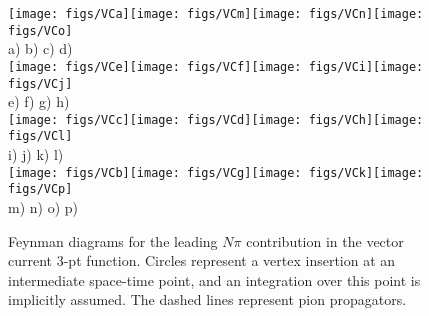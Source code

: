 \documentclass[11pt,prd,aps,showpacs,eqsecnum,floatfix,nofootinbib,preprint,tightenlines]{revtex4}
\begin{document}
%
\begin{figure}[t]
\texttt{[image: figs/VCa]}\hspace{0.3cm}\texttt{[image: figs/VCm]}\hspace{0.3cm}\texttt{[image: figs/VCn]}\hspace{0.3cm}\texttt{[image: figs/VCo]}\\
a)\hspace{3.5cm} b)\hspace{3.5cm} c)\hspace{3.5cm} d)\\[3ex]
\texttt{[image: figs/VCe]}\hspace{0.3cm}\texttt{[image: figs/VCf]}\hspace{0.3cm}\texttt{[image: figs/VCi]}\hspace{0.3cm}\texttt{[image: figs/VCj]}\\
e)\hspace{3.5cm} f)\hspace{3.5cm} g)\hspace{3.5cm} h) \\[3ex]
\texttt{[image: figs/VCc]}\hspace{0.3cm}\texttt{[image: figs/VCd]}\hspace{0.3cm}\texttt{[image: figs/VCh]}\hspace{0.3cm}\texttt{[image: figs/VCl]}\\
i)\hspace{3.5cm} j)\hspace{3.5cm} k)\hspace{3.5cm} l)\\[3ex]
\texttt{[image: figs/VCb]}\hspace{0.3cm}\texttt{[image: figs/VCg]}\hspace{0.3cm}\texttt{[image: figs/VCk]}\hspace{0.3cm}\texttt{[image: figs/VCp]}\\
m)\hspace{3.5cm} n)\hspace{3.5cm} o)\hspace{3.5cm} p)\\[0.3ex]
\caption{Feynman diagrams for the leading $N\pi$ contribution in the vector current 3-pt function. Circles represent a vertex insertion at an intermediate space-time point, and an integration over this point is implicitly assumed. The dashed lines represent pion propagators. }
\label{fig:Npidiags3pt}
\end{figure}
\end{document}
